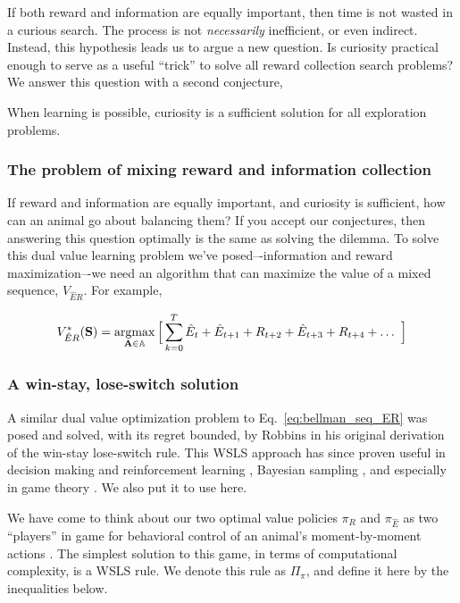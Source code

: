 If both reward and information are equally important, then time is not wasted in a curious search. The process is not \textit{necessarily} inefficient, or even indirect. Instead, this hypothesis leads us to argue a new question. Is curiosity practical enough to serve as a useful ``trick'' to solve all reward collection search problems? We answer this question with a second conjecture,

\begin{conjecture}
	When learning is possible, curiosity is a sufficient solution for all exploration problems.
\end{conjecture}


\subsubsection*{The problem of mixing reward and information collection}
If reward and information are equally important, and curiosity is sufficient, how can an animal go about balancing them? If you accept our conjectures, then answering this question optimally is the same as solving the dilemma. To solve this dual value learning problem we’ve posed–-information and reward maximization–-we need an algorithm that can maximize the value of a mixed sequence, $V_{\hat{E}R}$. For example,

\begin{equation}
	\label{eq:bellman_seq_ER}
	V^*_{\hat{E}R}(\mathbf{S}) = \operatorname*{argmax}_{\mathbf{A} \in \mathbb{A}} \Big [\sum_{k=0}^{T} \hat{E}_t + \hat{E}_{t+1} + R_{t+2} + \hat{E}_{t+3} + R_{t+4} + \ldots  \ \Big ]
\end{equation}

\subsubsection*{A win-stay, lose-switch solution}
A similar dual value optimization problem to Eq.~\ref{eq:bellman_seq_ER} was posed and solved, with its regret bounded, by Robbins \cite{Robbins1952} in his original derivation of the win-stay lose-switch rule. This WSLS approach has since proven useful in decision making and reinforcement learning \cite{Estes1994TowardAS,Worthy2014}, Bayesian sampling \cite{Bonawitz2014}, and especially in game theory \cite{Nowak1993}. We also put it to use here. 

We have come to think about our two optimal value policies $\pi_R$ and $\pi_{\hat E}$ as two ``players'' in game for behavioral control of an animal's moment-by-moment actions \cite{Estes1994TowardAS}. The simplest solution to this game, in terms of computational complexity, is a WSLS rule. We denote this rule as $\Pi_\pi$, and define it here by the inequalities below. 

